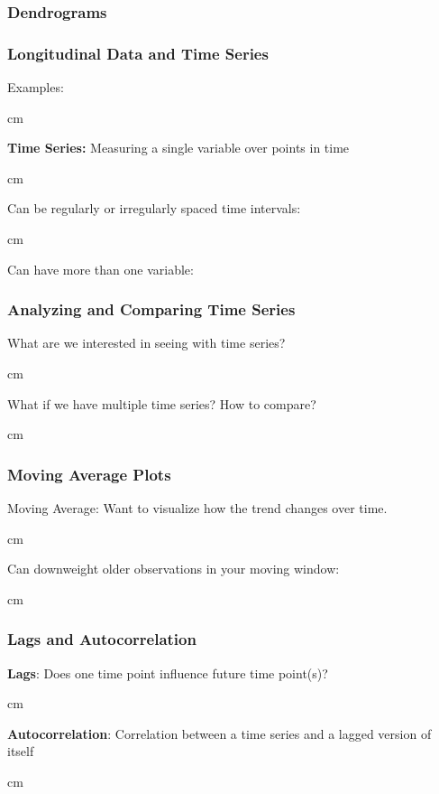\documentclass{beamer} %
\begin{document}
\begin{frame}\frametitle{Dendrograms}
	\small
	
	
\end{frame}



\begin{frame}\frametitle{Longitudinal Data and Time Series}
	\small
	
	Examples:
	
	 cm
	
	\textbf{Time Series:}  Measuring a single variable over points in time
	
	 cm
	
	Can be regularly or irregularly spaced time intervals:
	
	 cm
	
	Can have more than one variable:
	
	
\end{frame}


\begin{frame}\frametitle{Analyzing and Comparing Time Series}
	\small
	
	What are we interested in seeing with time series?
	
	 cm
	
	What if we have multiple time series?  How to compare?
	
	 cm
	
\end{frame}




\begin{frame}\frametitle{Moving Average Plots}
	\small
	
	Moving Average:  Want to visualize how the trend changes over time.
	
	 cm
	
	Can downweight older observations in your moving window:
	
	 cm
	
\end{frame}




\begin{frame}\frametitle{Lags and Autocorrelation}
	\small
	
	\textbf{Lags}:  Does one time point influence future time point(s)?
	
	 cm
	
	\textbf{Autocorrelation}:  Correlation between a time series and a lagged version of itself
	
	 cm
	
	
	
	
\end{frame}
\end{document}
